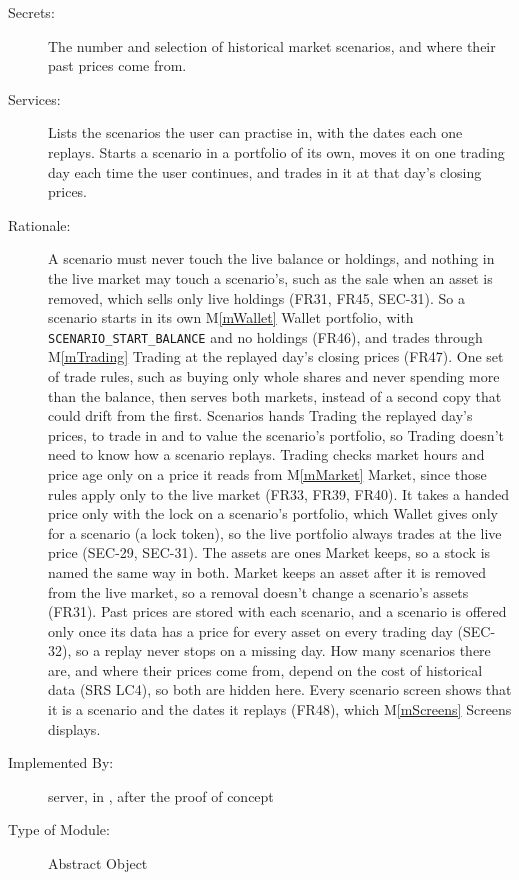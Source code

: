 \documentclass[12pt, titlepage]{article}
\newcommand{\mref}[1]{M\ref{#1}}
\begin{document}
\begin{description}
\item[Secrets:] The number and selection of historical market scenarios, and where their past prices come from.
\item[Services:] Lists the scenarios the user can practise in, with the dates each one replays. Starts a scenario in a portfolio of its own, moves it on one trading day each time the user continues, and trades in it at that day's closing prices.
\item[Rationale:] A scenario must never touch the live balance or holdings, and nothing in the live market may touch a scenario's, such as the sale when an asset is removed, which sells only live holdings (FR31, FR45, SEC-31). So a scenario starts in its own \mref{mWallet} Wallet portfolio, with \texttt{SCENARIO\_START\_BALANCE} and no holdings (FR46), and trades through \mref{mTrading} Trading at the replayed day's closing prices (FR47). One set of trade rules, such as buying only whole shares and never spending more than the balance, then serves both markets, instead of a second copy that could drift from the first. Scenarios hands Trading the replayed day's prices, to trade in and to value the scenario's portfolio, so Trading doesn't need to know how a scenario replays. Trading checks market hours and price age only on a price it reads from \mref{mMarket} Market, since those rules apply only to the live market (FR33, FR39, FR40). It takes a handed price only with the lock on a scenario's portfolio, which Wallet gives only for a scenario (a lock token), so the live portfolio always trades at the live price (SEC-29, SEC-31). The assets are ones Market keeps, so a stock is named the same way in both. Market keeps an asset after it is removed from the live market, so a removal doesn't change a scenario's assets (FR31). Past prices are stored with each scenario, and a scenario is offered only once its data has a price for every asset on every trading day (SEC-32), so a replay never stops on a missing day. How many scenarios there are, and where their prices come from, depend on the cost of historical data (SRS LC4), so both are hidden here. Every scenario screen shows that it is a scenario and the dates it replays (FR48), which \mref{mScreens} Screens displays.
\item[Implemented By:] \progname{} server, in , after the proof of concept
\item[Type of Module:] Abstract Object
\end{description}
\end{document}
